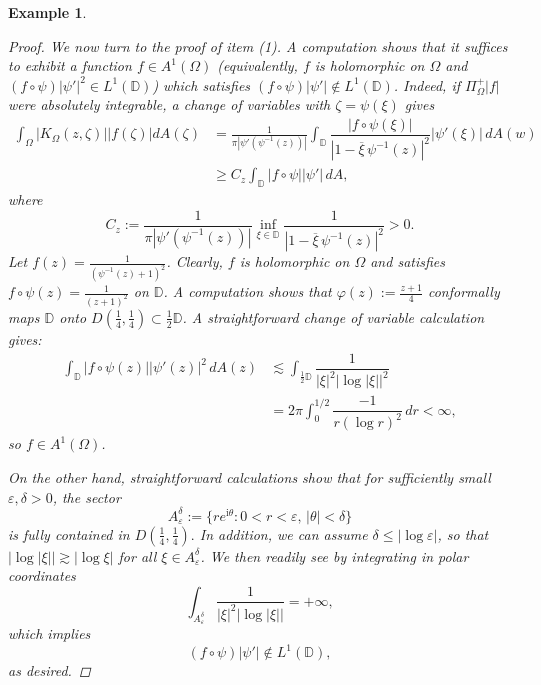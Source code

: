 \documentclass{amsart}
\newtheorem{example}[theorem]{Example}
\theoremstyle{definition}
\numberwithin{equation}{section}
\begin{document}
\begin{example}
\begin{proof}
We now turn to the proof of item (1). A computation shows that it suffices to exhibit a function $f \in A^1(\Omega) $ (equivalently, $f$ is holomorphic on $\Omega$ and $(f\circ \psi)|\psi'|^2 \in L^1(\mathbb{D})$) which satisfies $(f \circ \psi) |\psi'| \notin L^1(\mathbb{D})$. Indeed, if $\Pi_{\Omega}^+|f|$ were absolutely integrable, a change of variables with $\zeta=\psi(\xi)$ gives
\begin{align*}
\int_{\Omega}|K_{\Omega}(z,\zeta)||f(\zeta)|dA(\zeta) & = \frac{1}{\pi |\psi'(\psi^{-1}(z))|} \int_{\mathbb{D}}\dfrac{|f \circ \psi(\xi)|}{|1-\overline{\xi}\,\psi^{-1}(z)|^2} |\psi'(\xi)| \, dA(w) \\ 
& \geq C_z \int_{\mathbb{D}} |f \circ \psi| |\psi'| \, dA,
\end{align*}
where $$ C_z:=\frac{1}{\pi |\psi'(\psi^{-1}(z))|} \inf_{\xi \in \mathbb{D}} \dfrac{1}{|1-\overline{\xi}\,\psi^{-1}(z)|^2}>0. $$ Let $f(z)=\frac{1}{(\psi^{-1}(z)+1)^2}$. Clearly, $f$ is holomorphic on $\Omega$ and satisfies $f \circ \psi(z)= \frac{1}{(z+1)^2}$ on $\mathbb{D}$. A computation shows that $\varphi(z):= \frac{z+1}{4}$ conformally maps $\mathbb{D}$ onto $D(\frac{1}{4},\frac{1}{4}) \subset \frac{1}{2}\mathbb{D}$. A straightforward change of variable calculation gives: 
\begin{align*}
  \int_{\mathbb{D}} |f \circ \psi(z)||\psi'(z)|^2 \, dA(z) 
 & \lesssim \int_{\frac{1}{2} \mathbb{D}}  \dfrac{1}{|\xi|^2|\log{|\xi|}|^2} \\
 & = 2 \pi \int_{0}^{1/2} \dfrac{-1}{r (\log{r})^2} \, dr< \infty,
\end{align*}
so $f \in A^1(\Omega)$.


On the other hand, straightforward calculations show that for sufficiently small $\varepsilon, \delta>0$, the sector
$$A_\varepsilon^\delta:= \{r e^{\mathrm{i} \theta}: 0<r<\varepsilon, \, |\theta|<\delta\}$$
is fully contained in $D(\frac{1}{4}, \frac{1}{4}).$
In addition, we can assume $\delta \leq |\log{\varepsilon}|$, so that $|\log{|\xi|}| \gtrsim |\log{\xi}|$ for all $\xi \in A_\varepsilon^\delta$. We then readily see by integrating in polar coordinates
$$ \int_{A_\varepsilon^\delta} \dfrac{1}{|\xi|^2|\log{|\xi|}|}=+\infty,$$
which implies 
$$(f \circ \psi) |\psi'| \notin L^1(\mathbb{D}), $$ as desired.
\end{proof}
\end{example}
\end{document}
